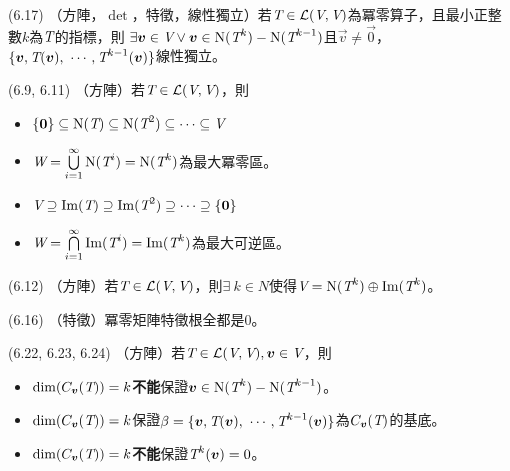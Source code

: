 \item \begin{theorem}{(6.17)} （方陣，$\det$，特徵，線性獨立）若$\textit{T} \in \mathcal{L}(\textit{V}, \textit{V})$為冪零算子，且最小正整數$k$為$\textit{T}$的指標，則
	$\exists \boldsymbol{v} \in \textit{V} \lor \boldsymbol{v} \in \operatorname{N}(\textit{T}^k) - \operatorname{N}(\textit{T}^{k - 1})$且$\vec{v} \neq \vec{0}$，
	$\{\boldsymbol{v}, \textit{T}(\boldsymbol{v}), \ \cdots, \textit{T}^{k - 1}(\boldsymbol{v})\}$線性獨立。
\end{theorem}

\item \begin{theorem}{(6.9, 6.11)} （方陣）若$\textit{T} \in \mathcal{L}(\textit{V}, \textit{V})$，則
	\begin{itemize}
		\item $\{\boldsymbol{0}\} \subseteq \operatorname{N}(\textit{T}) \subseteq \operatorname{N}(\textit{T}^2) \subseteq \cdots \subseteq \textit{V}$
		\item $\textit{W} = \bigcup\limits_{i = 1}^{\infty} \operatorname{N}(\textit{T}^i) = \operatorname{N}(\textit{T}^k)$為最大冪零區。
		\item $\textit{V} \supseteq \operatorname{Im}(\textit{T}) \supseteq \operatorname{Im}(\textit{T}^2) \supseteq \cdots \supseteq \{\boldsymbol{0}\}$
		\item $\textit{W} = \bigcap\limits_{i = 1}^{\infty} \operatorname{Im}(\textit{T}^i) = \operatorname{Im}(\textit{T}^k)$為最大可逆區。
	\end{itemize}
\end{theorem}

\item \begin{theorem}{(6.12)} （方陣）若$\textit{T} \in \mathcal{L}(\textit{V}, \textit{V})$，則$\exists \ k \in N$使得$\textit{V} = \operatorname{N}(\textit{T}^k) \oplus \operatorname{Im}(\textit{T}^k)$。
\end{theorem}

\item \begin{theorem}{(6.16)} （特徵）冪零矩陣特徵根全都是$0$。
\end{theorem}

\item \begin{theorem}{(6.22, 6.23, 6.24)} （方陣）若$\textit{T} \in \mathcal{L}(\textit{V}, \textit{V}), \boldsymbol{v} \in \textit{V}$，則
	\begin{itemize}
		\item $\dim(C_{\boldsymbol{v}}(\textit{T})) = k$\textbf{不能}保證$\boldsymbol{v} \in \operatorname{N}(\textit{T}^k) - \operatorname{N}(\textit{T}^{k - 1})$。
		\item $\dim(C_{\boldsymbol{v}}(\textit{T})) = k$保證$\beta = \{\boldsymbol{v}, \textit{T}(\boldsymbol{v}), \ \cdots, \textit{T}^{k - 1}(\boldsymbol{v})\}$為$C_{\boldsymbol{v}}(\textit{T})$的基底。
		\item $\dim(C_{\boldsymbol{v}}(\textit{T})) = k$\textbf{不能}保證$\textit{T}^k(\boldsymbol{v}) = 0$。
	\end{itemize}
\end{theorem}


